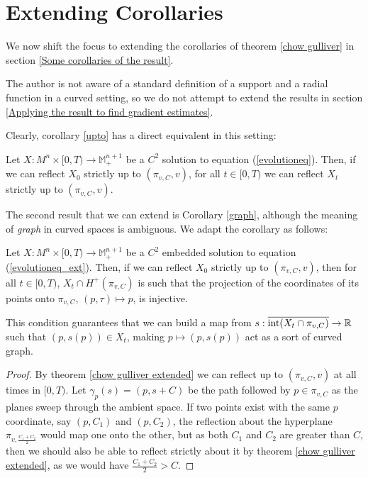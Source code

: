 \section{Extending Corollaries}

We now shift the focus to extending the corollaries of theorem \ref{chow gulliver} in section \ref{Some corollaries of the result}. 

The author is not aware of a standard definition of a support and a radial function in a curved setting, so we do not attempt to extend the results in section \ref{Applying the result to find gradient estimates}. 

Clearly, corollary \ref{upto} has a direct equivalent in this setting:
\begin{cor}
	Let $X:M^n\times [0,T) \rightarrow \mathbb{M}^{n+1}_+$ be a $C^2$ solution to equation (\ref{evolutioneq}). Then, if we can reflect $X_0$ strictly up to $(\pi_{v,C},v)$, for all $t\in [0,T)$ we can reflect $X_t$ strictly up to $(\pi_{v,C},v)$.  
\end{cor}

The second result that we can extend is Corollary \ref{graph}, although the meaning of \textit{graph} in curved spaces is ambiguous. We adapt the corollary as follows: 


\begin{cor}
	Let $X:M^n\times [0,T) \rightarrow \mathbb{M}^{n+1}_+$ be a $C^2$ embedded solution to equation (\ref{evolutioneq_ext}). Then, if we can reflect $X_0$ strictly up to $(\pi_{v,C},v)$, then for all $t\in [0,T)$, $X_t \cap H^+(\pi_{v,C})$ is such that the projection of the coordinates of its points onto $\pi_{v,C}$, $(p, \tau)\mapsto p$, is injective. 
\end{cor}
This condition guarantees that we can build a map from $s:\overline{\mathrm{int}(X_t \cap \pi_{v,C})}\rightarrow \mathbb{R}$ such that $(p, s(p))\in X_t$, making $p\mapsto (p, s(p))$ act as a sort of curved graph. 
\begin{proof}
	By  theorem \ref{chow gulliver extended} we can reflect up to $(\pi_{v,C},v)$ at all times in $[0,T)$. Let $\gamma_p(s)=(p, s+C)$ be the path followed by $p\in \pi_{v,C}$ as the planes sweep through the ambient space. If two points exist with the same $p$ coordinate, say $(p, C_1)$ and $(p, C_2)$, the reflection about the hyperplane $\pi_{v,\frac{ C_1 +  C_2}{2}}$ would map one onto the other, but as both $C_1$ and $C_2$ are greater than $C$, then we should also be able to reflect strictly about it by theorem \ref{chow gulliver extended}, as we would have $\frac{ C_1 +  C_2}{2}>C$. 
\end{proof}

